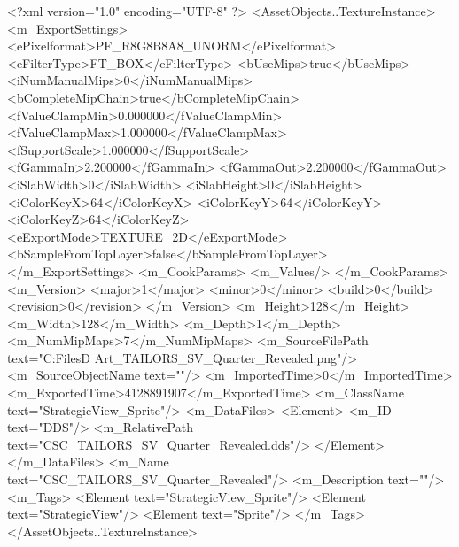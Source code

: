 <?xml version="1.0" encoding="UTF-8" ?>
<AssetObjects..TextureInstance>
	<m_ExportSettings>
		<ePixelformat>PF_R8G8B8A8_UNORM</ePixelformat>
		<eFilterType>FT_BOX</eFilterType>
		<bUseMips>true</bUseMips>
		<iNumManualMips>0</iNumManualMips>
		<bCompleteMipChain>true</bCompleteMipChain>
		<fValueClampMin>0.000000</fValueClampMin>
		<fValueClampMax>1.000000</fValueClampMax>
		<fSupportScale>1.000000</fSupportScale>
		<fGammaIn>2.200000</fGammaIn>
		<fGammaOut>2.200000</fGammaOut>
		<iSlabWidth>0</iSlabWidth>
		<iSlabHeight>0</iSlabHeight>
		<iColorKeyX>64</iColorKeyX>
		<iColorKeyY>64</iColorKeyY>
		<iColorKeyZ>64</iColorKeyZ>
		<eExportMode>TEXTURE_2D</eExportMode>
		<bSampleFromTopLayer>false</bSampleFromTopLayer>
	</m_ExportSettings>
	<m_CookParams>
		<m_Values/>
	</m_CookParams>
	<m_Version>
		<major>1</major>
		<minor>0</minor>
		<build>0</build>
		<revision>0</revision>
	</m_Version>
	<m_Height>128</m_Height>
	<m_Width>128</m_Width>
	<m_Depth>1</m_Depth>
	<m_NumMipMaps>7</m_NumMipMaps>
	<m_SourceFilePath text="C:\Users\Shadow\Desktop\Working Files\2D Art\Quarters\Tailors\StrategicView\CSC_TAILORS_SV_Quarter_Revealed.png"/>
	<m_SourceObjectName text=""/>
	<m_ImportedTime>0</m_ImportedTime>
	<m_ExportedTime>4128891907</m_ExportedTime>
	<m_ClassName text="StrategicView_Sprite"/>
	<m_DataFiles>
		<Element>
			<m_ID text="DDS"/>
			<m_RelativePath text="CSC_TAILORS_SV_Quarter_Revealed.dds"/>
		</Element>
	</m_DataFiles>
	<m_Name text="CSC_TAILORS_SV_Quarter_Revealed"/>
	<m_Description text=""/>
	<m_Tags>
		<Element text="StrategicView_Sprite"/>
		<Element text="StrategicView"/>
		<Element text="Sprite"/>
	</m_Tags>
</AssetObjects..TextureInstance>


